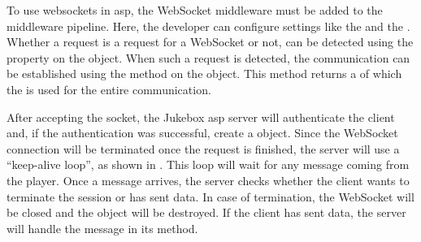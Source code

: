

To use websockets in \gls{asp}, the WebSocket middleware must be added to the middleware pipeline. Here, the developer can configure settings like the  and the . Whether a request is a request for a WebSocket or not, can be detected using the  property on the  object. When such a request is detected, the communication can be established using the  method on the  object. This method returns a  of which the  is used for the entire communication. \cite{aspWebsockets}

After accepting the socket, the Jukebox \gls{asp} server will authenticate the client and, if the authentication was successful, create a  object. Since the WebSocket connection will be terminated once the request is finished, the server will use a \enquote{keep-alive loop}, as shown in . This loop will wait for any message coming from the player. Once a message arrives, the server checks whether the client wants to terminate the session or has sent data. In case of termination, the WebSocket will be closed and the  object will be destroyed. If the client has sent data, the server will handle the message in its  method.

\newpage

